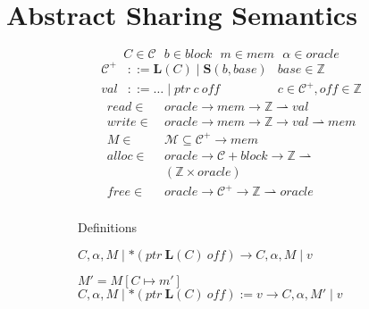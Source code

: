 \documentclass{article}
\begin{document}



\section{Abstract Sharing Semantics}

\begin{figure}
  \begin{subfigure}{0.4\textwidth}
    \[C \in \mathcal{C}~~~ b \in \mathit{block}~~~  m \in \mathit{mem}~~~ \alpha \in \mathit{oracle}\]
    \[\begin{aligned}
    \mathcal{C}^+ & ::= \mathbf{L}(C) \mid \mathbf{S}(b, \mathit{base}) &
    \mathit{base} \in \mathbb{Z} \\
    \mathit{val} & ::= \ldots \mid \mathit{ptr} ~ c ~ \mathit{off} &
    c \in \mathcal{C}^+, \mathit{off} \in \mathbb{Z}
    \end{aligned}\]
    \[\begin{split}
    \mathit{read} \in ~ & \mathit{oracle} \rightarrow \mathit{mem} \rightarrow
    \mathbb{Z} \rightharpoonup \mathit{val} \\
    \mathit{write} \in ~ & \mathit{oracle} \rightarrow \mathit{mem} \rightarrow
    \mathbb{Z} \rightarrow \mathit{val} \rightharpoonup \mathit{mem} \\
    M \in ~ & \mathcal{M} \subseteq \mathcal{C}^+ \rightarrow \mathit{mem} \\
    \mathit{alloc} \in ~ & \mathit{oracle} \rightarrow
    \mathcal{C} + \mathit{block} \rightarrow \mathbb{Z} \rightharpoonup \\
    & (\mathbb{Z} \times \mathit{oracle}) \\
    \mathit{free} \in ~ & \mathit{oracle} \rightarrow \mathcal{C}^+ \rightarrow
    \mathbb{Z} \rightharpoonup \mathit{oracle} \\
    \end{split}\]

    \caption{Definitions}
    \label{subfig:defs}
  \end{subfigure}
  \begin{subfigure}{0.55\textwidth}
             {\(C, \alpha, M \mid *(\mathit{ptr} ~ \mathbf{L}(C) ~ \mathit{off})
               \longrightarrow C, \alpha, M \mid v\)}

                {\(M' = M[C \mapsto m']\)}
                {\(C, \alpha, M \mid *(\mathit{ptr} ~ \mathbf{L}(C) ~ \mathit{off}) := v
                  \longrightarrow C, \alpha, M' \mid v\)}


\end{subfigure}
\end{figure}
\end{document}
